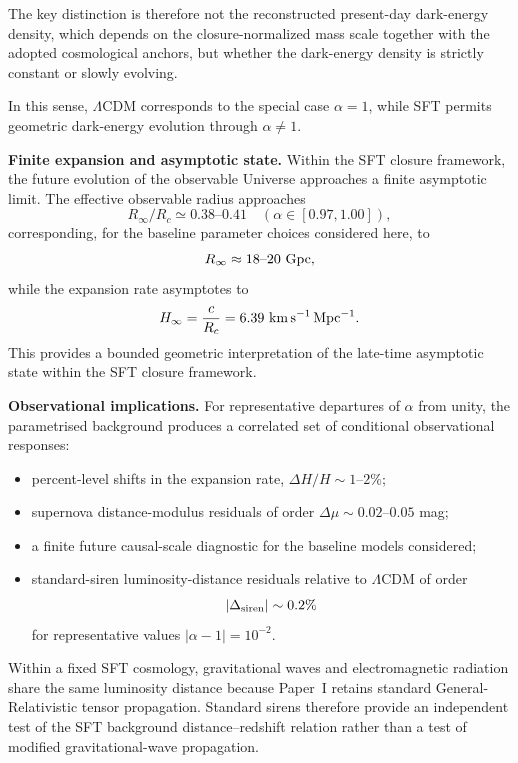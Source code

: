 \documentclass[12pt]{article}
\begin{document}
The key distinction is therefore not the reconstructed present-day
dark-energy density, which depends on the closure-normalized mass scale
together with the adopted cosmological anchors, but whether the
dark-energy density is strictly constant or slowly evolving.

In this sense, $\Lambda$CDM corresponds to the special case $\alpha=1$, while SFT permits geometric dark-energy evolution through $\alpha\neq1$.

\medskip
\noindent
\textbf{Finite expansion and asymptotic state.}  
Within the SFT closure framework, the future evolution of the observable Universe approaches a finite asymptotic limit.  
The effective observable radius approaches
\[
R_\infty/R_c \simeq 0.38\text{--}0.41 
\quad (\alpha\in[0.97,1.00]),
\]
corresponding, for the baseline parameter choices considered here, to
\[
R_\infty \approx 18\text{--}20~{\rm Gpc},
\]
while the expansion rate asymptotes to
\[
H_\infty = \frac{c}{R_c}
= 6.39~{\rm km\,s^{-1}\,Mpc^{-1}}.
\]
This provides a bounded geometric interpretation of the late-time asymptotic state within the SFT closure framework.

\medskip
\noindent
\textbf{Observational implications.}
For representative departures of $\alpha$ from unity, the
parametrised background produces a correlated set of conditional
observational responses:
\begin{itemize}
\item percent-level shifts in the expansion rate,
\(\Delta H/H\sim1\text{--}2\%\);
\item supernova distance-modulus residuals of order
\(\Delta\mu\sim0.02\text{--}0.05\) mag;
\item a finite future causal-scale diagnostic for the baseline models
considered;
\item standard-siren luminosity-distance residuals relative to
$\Lambda$CDM of order
\[
|\Delta_{\rm siren}|
\sim0.2\%
\]
for representative values
\(|\alpha-1|=10^{-2}\).
\end{itemize}

Within a fixed SFT cosmology, gravitational waves and electromagnetic
radiation share the same luminosity distance because Paper~I retains
standard General-Relativistic tensor propagation. Standard sirens
therefore provide an independent test of the SFT background
distance--redshift relation rather than a test of modified
gravitational-wave propagation.
\end{document}
